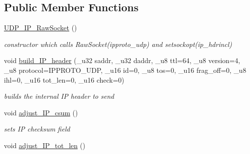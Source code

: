 \subsection*{Public Member Functions}
\begin{CompactItemize}
\item 
\hypertarget{classsocketpp_1_1UDP__IP__RawSocket_90e90d941b64d234c231ca543fe8745a}{
\hyperlink{classsocketpp_1_1UDP__IP__RawSocket_90e90d941b64d234c231ca543fe8745a}{UDP\_\-IP\_\-RawSocket} ()}
\label{classsocketpp_1_1UDP__IP__RawSocket_90e90d941b64d234c231ca543fe8745a}

\begin{CompactList}\small\item\em constructor which calls RawSocket(ipproto\_\-udp) and setsockopt(ip\_\-hdrincl) \item\end{CompactList}\item 
\hypertarget{classsocketpp_1_1UDP__IP__RawSocket_bd80d6a249cfce0ed85dfbd55d901065}{
void \hyperlink{classsocketpp_1_1UDP__IP__RawSocket_bd80d6a249cfce0ed85dfbd55d901065}{build\_\-IP\_\-header} (\_\-u32 saddr, \_\-u32 daddr, \_\-u8 ttl=64, \_\-u8 version=4, \_\-u8 protocol=IPPROTO\_\-UDP, \_\-u16 id=0, \_\-u8 tos=0, \_\-u16 frag\_\-off=0, \_\-u8 ihl=0, \_\-u16 tot\_\-len=0, \_\-u16 check=0)}
\label{classsocketpp_1_1UDP__IP__RawSocket_bd80d6a249cfce0ed85dfbd55d901065}

\begin{CompactList}\small\item\em builds the internal IP header to send \item\end{CompactList}\item 
\hypertarget{classsocketpp_1_1UDP__IP__RawSocket_066530debd67e2f4746f33780bc8818d}{
void \hyperlink{classsocketpp_1_1UDP__IP__RawSocket_066530debd67e2f4746f33780bc8818d}{adjust\_\-IP\_\-csum} ()}
\label{classsocketpp_1_1UDP__IP__RawSocket_066530debd67e2f4746f33780bc8818d}

\begin{CompactList}\small\item\em sets IP checksum field \item\end{CompactList}\item 
\hypertarget{classsocketpp_1_1UDP__IP__RawSocket_d13e97a0b436eeb96825965223361095}{
void \hyperlink{classsocketpp_1_1UDP__IP__RawSocket_d13e97a0b436eeb96825965223361095}{adjust\_\-IP\_\-tot\_\-len} ()}
\label{classsocketpp_1_1UDP__IP__RawSocket_d13e97a0b436eeb96825965223361095}


\end{CompactItemize}
